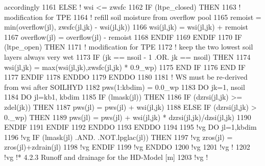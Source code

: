 \begin{DoxyCode}
{{{       accordingly}
1161             \textcolor{keywordflow}{ELSE} \textcolor{comment}{! wsi <= zwsfc}
1162               \textcolor{keywordflow}{IF} (ltpe\_closed) \textcolor{keywordflow}{THEN}
1163                 \textcolor{comment}{! modification for TPE}
1164                 \textcolor{comment}{! refill soil moisture from overflow pool}
1165                 remoist = min(overflow(jl), zwsfc(jl,jk) - wsi(jl,jk))
1166                 wsi(jl,jk) = wsi(jl,jk) + remoist
1167                 overflow(jl) = overflow(jl) - remoist
1168 \textcolor{keywordflow}{              ENDIF}
1169 \textcolor{keywordflow}{            ENDIF}
1170             \textcolor{keywordflow}{IF} (ltpe\_open) \textcolor{keywordflow}{THEN}
1171               \textcolor{comment}{! modification for TPE}
1172               \textcolor{comment}{! keep the two lowest soil layers always very wet }
1173               \textcolor{keywordflow}{IF} (jk == nsoil - 1 .OR. jk == nsoil) \textcolor{keywordflow}{THEN}
1174                 wsi(jl,jk) = max(wsi(jl,jk),zwsfc(jl,jk) * 0.9\_wp)
1175 \textcolor{keywordflow}{              END IF}
1176 \textcolor{keywordflow}{            END IF}
1177 \textcolor{keywordflow}{          ENDIF}
1178 \textcolor{keywordflow}{        ENDDO}
1179 \textcolor{keywordflow}{      ENDDO}
1180 
1181       \textcolor{comment}{! WS must be re-derived from wsi after SOILHYD}
1182       pws(1:kbdim) = 0.0\_wp
1183       \textcolor{keywordflow}{DO} jk=1, nsoil
1184         \textcolor{keywordflow}{DO} jl=kb1, kbdim
1185           \textcolor{keywordflow}{IF} (lmask(jl)) \textcolor{keywordflow}{THEN}
1186             \textcolor{keywordflow}{IF} (dzrsi(jl,jk) >= zdel(jk)) \textcolor{keywordflow}{THEN}
1187               pws(jl) = pws(jl) + wsi(jl,jk)
1188             \textcolor{keywordflow}{ELSE} \textcolor{keywordflow}{IF} (dzrsi(jl,jk) > 0.\_wp) \textcolor{keywordflow}{THEN}
1189               pws(jl) = pws(jl) + wsi(jl,jk) * dzrsi(jl,jk)/dzsi(jl,jk)
1190 \textcolor{keywordflow}{            ENDIF}
1191 \textcolor{keywordflow}{          ENDIF}
1192 \textcolor{keywordflow}{        ENDDO}
1193 \textcolor{keywordflow}{      ENDDO}
1194 
1195 \textcolor{comment}{!vg       DO jl=1,kbdim}
1196 \textcolor{comment}{!vg         IF (lmask(jl) .AND. .NOT.lpglac(jl)) THEN}
1197 \textcolor{comment}{!vg           zros(jl) = zros(jl)+zdrain(jl)}
1198 \textcolor{comment}{!vg         ENDIF}
1199 \textcolor{comment}{!vg       ENDDO}
1200 \textcolor{comment}{!vg }
1201 \textcolor{comment}{!vg !}
1202 \textcolor{comment}{!vg !*  4.2.3  Runoff and drainage for the HD-Model [m]}
1203 \textcolor{comment}{!vg !}
}}
\end{DoxyCode}
